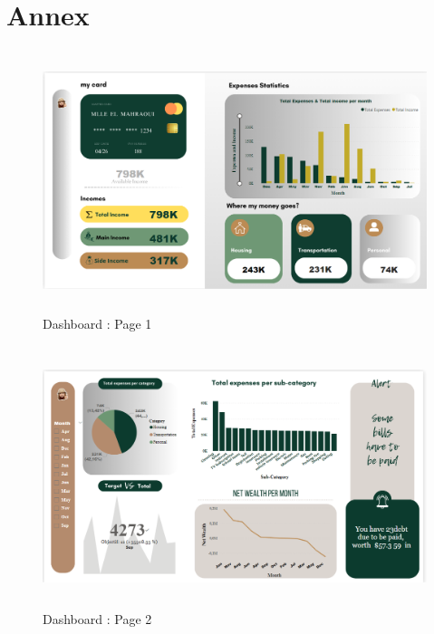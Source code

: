 \chapter*{Annex}
\begin{figure}[h]
    \centering
    \includegraphics[width=5.0in, height=3.0in]{Figure/Overview (2).png}
    \caption{Dashboard : Page 1}
    \label{fig:enter-label}
   
\end{figure} 

\begin{figure}[h]
    \centering
    \includegraphics[width=5.0in, height=3.0in]{Figure/visualisation.png}
    \caption{Dashboard : Page 2}
    \label{fig:enter-label}
   
\end{figure} 